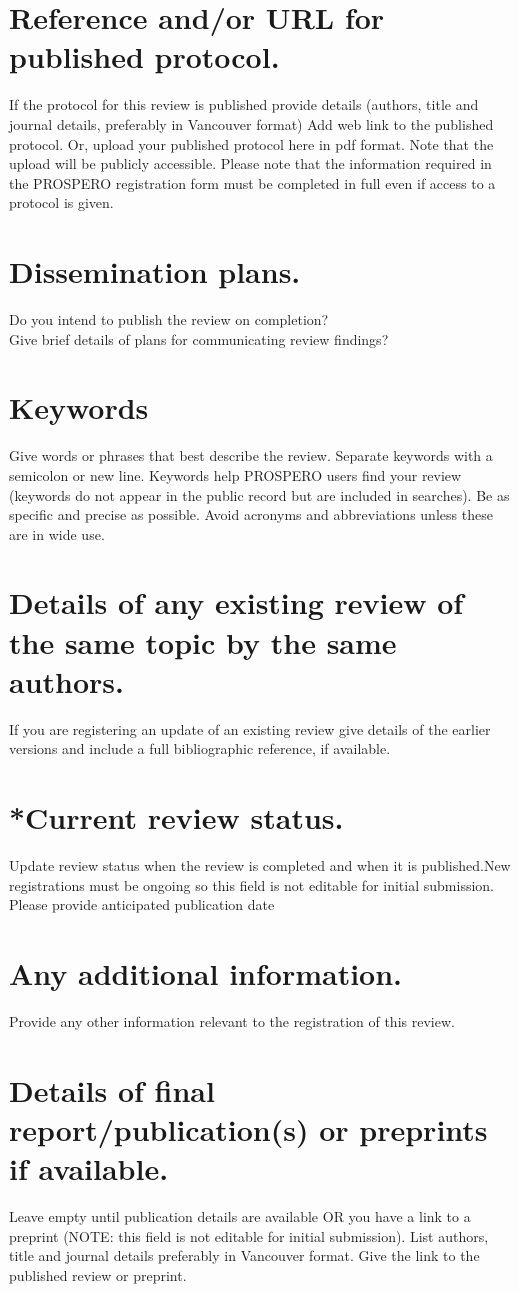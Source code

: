 \documentclass[11pt,letterpaper]{article}
\newcommand{\dataitem}[2]{
	\section{#1}
	\textcolor{codegray}{#2} \\
}
\begin{document}
\dataitem{Reference and/or URL for published protocol.}{If the protocol for this review is published provide details (authors, title and journal details, preferably in Vancouver format) Add web link to the published protocol. Or, upload your published protocol here in pdf format. Note that the upload will be publicly accessible. Please note that the information required in the PROSPERO registration form must be completed in full even if access to a protocol is given.}

\dataitem{Dissemination plans.}{Do you intend to publish the review on completion?}
\textcolor{codegray}{Give brief details of plans for communicating review findings?} \\


\dataitem{Keywords}{Give words or phrases that best describe the review. Separate keywords with a semicolon or new line. Keywords help PROSPERO users find your review (keywords do not appear in the public record but are included in searches). Be as specific and precise as possible. Avoid acronyms and abbreviations unless these are in wide use.}		


\dataitem{Details of any existing review of the same topic by the same authors.}{If you are registering an update of an existing review give details of the earlier versions and include a full bibliographic reference, if available.}

\dataitem{*Current review status.}{Update review status when the review is completed and when it is published.New registrations must be ongoing so this field is not editable for initial submission. Please provide anticipated publication date}

\dataitem{Any additional information.}{Provide any other information relevant to the registration of this review.}

\dataitem{Details of final report/publication(s) or preprints if available.}{Leave empty until publication details are available OR you have a link to a preprint (NOTE: this field is not editable for initial submission). List authors, title and journal details preferably in Vancouver format. Give the link to the published review or preprint.}		
		
\end{document}
